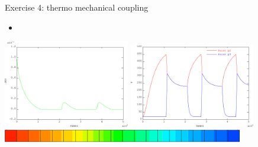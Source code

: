 \begin{frame}{
                 {Exercise 4: thermo mechanical coupling}}
             {}
  \begin{itemize}
    \item {}
  \end{itemize}
  \begin{center}
    \includegraphics[width=5.5cm]{images/exo/exo_4_solu_evol_jeu}
    \includegraphics[width=5.5cm]{images/exo/exo_4_solu_evol_t}\\
    \vspace{0.5cm}
    \if {}
    \else
      \includegraphics[width=10.5cm]{images/exo/exo_4_solu_temperature.101}
    \fi
  \end{center}
\end{frame}

